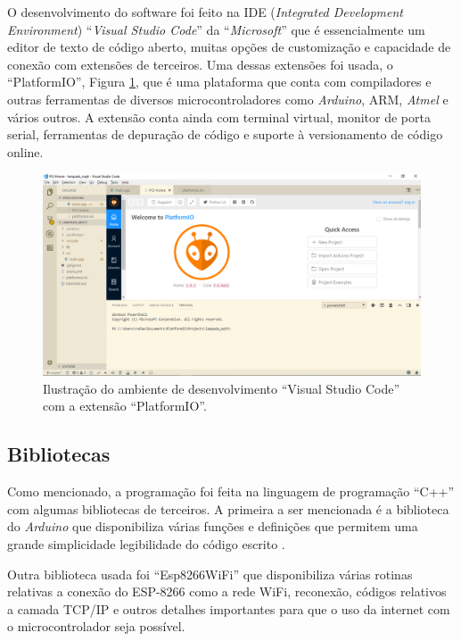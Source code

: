 O desenvolvimento do software foi feito na IDE (\textit{Integrated Development Environment}) ``\textit{Visual Studio Code}'' da ``\textit{Microsoft}'' que é essencialmente um editor de texto de código aberto, muitas opções de customização e capacidade de conexão com extensões de terceiros. Uma dessas extensões foi usada, o ``PlatformIO'', Figura \ref{pio}, que é uma plataforma que conta com compiladores e outras ferramentas de diversos microcontroladores como \textit{Arduino}, ARM, \textit{Atmel} e vários outros. A extensão conta ainda com terminal virtual, monitor de porta serial, ferramentas de depuração de código e suporte à versionamento de código online.

\begin{figure}[ht]
    \begin{center}
    \includegraphics[width=\textwidth]{figuras/pio.PNG}
    \end{center}
    \caption[Ilustração do Visual Studio Code com o PlatformIO.]{Ilustração do ambiente de desenvolvimento ``Visual Studio Code'' com a extensão ``PlatformIO''.}
    \label{pio}
\end{figure}

\subsection{Bibliotecas}

Como mencionado, a programação foi feita na linguagem de programação ``C++'' com algumas bibliotecas de terceiros. A primeira a ser mencionada é a biblioteca do \textit{Arduino} que disponibiliza várias funções e definições que permitem uma grande simplicidade legibilidade do código escrito \cite{arduino}.

Outra biblioteca usada foi ``Esp8266WiFi'' \cite{espwifi}que disponibiliza várias rotinas relativas a conexão do ESP-8266 como a rede WiFi, reconexão, códigos relativos a camada TCP/IP e outros detalhes importantes para que o uso da internet com o microcontrolador seja possível.

